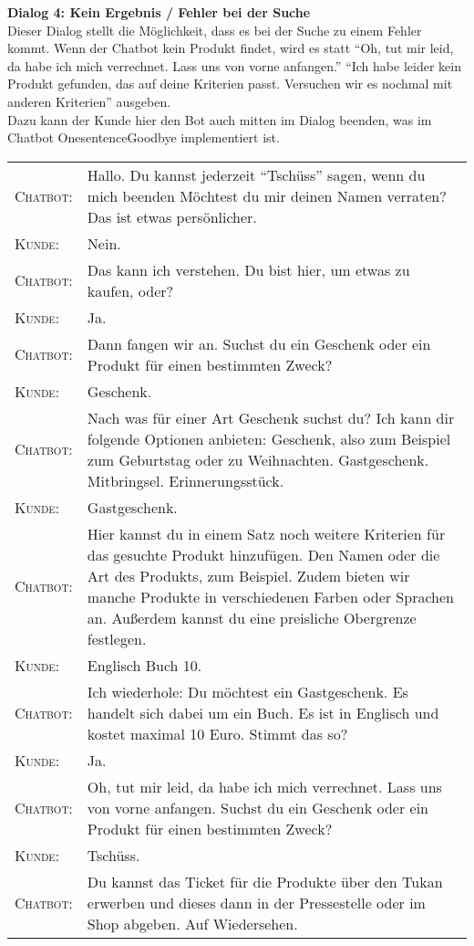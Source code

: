\Large\textbf{Dialog 4: Kein Ergebnis / Fehler bei der Suche}\\
\normalsize
Dieser Dialog stellt die Möglichkeit, dass es bei der Suche zu einem Fehler kommt. Wenn der Chatbot kein Produkt findet, wird es statt "`Oh, tut mir leid, da habe ich mich verrechnet. Lass uns von vorne anfangen."' "`Ich habe leider kein Produkt gefunden, das auf deine Kriterien passt. Versuchen wir es nochmal mit anderen Kriterien"' ausgeben.\\
Dazu kann der Kunde hier den Bot auch mitten im Dialog beenden, was im Chatbot OnesentenceGoodbye implementiert ist.
\vspace{8pt}
\begin{center}
\begin{tabular}{p{}p{}}
	\textsc{Chatbot:} & Hallo. Du kannst jederzeit "`Tschüss"' sagen, wenn du mich beenden  Möchtest du mir deinen Namen verraten? Das ist etwas persönlicher. \\
	\textsc{Kunde:} & Nein.\\
	\textsc{Chatbot:} & Das kann ich verstehen. Du bist hier, um etwas zu kaufen, oder? \\
	\textsc{Kunde:} & Ja. \\
	\textsc{Chatbot:} & Dann fangen wir an. Suchst du ein Geschenk oder ein Produkt für einen bestimmten Zweck? \\
	\textsc{Kunde:} & Geschenk.\\
	\textsc{Chatbot:} & Nach was für einer Art Geschenk suchst du? Ich kann dir folgende Optionen anbieten: Geschenk, also zum Beispiel zum Geburtstag oder zu Weihnachten. Gastgeschenk. Mitbringsel. Erinnerungsstück.\\
	\textsc{Kunde:} & Gastgeschenk. \\
	\textsc{Chatbot:} & Hier kannst du in einem Satz noch weitere Kriterien für das gesuchte Produkt hinzufügen. Den Namen oder die Art des Produkts, zum Beispiel. Zudem bieten wir manche Produkte in verschiedenen Farben oder Sprachen an. Außerdem kannst du eine preisliche Obergrenze festlegen.\\
	\textsc{Kunde:} & Englisch Buch 10.\\
	\textsc{Chatbot:} & Ich wiederhole: Du möchtest ein Gastgeschenk. Es handelt sich dabei um ein Buch. Es ist in Englisch und kostet maximal 10 Euro. Stimmt das so? \\
	\textsc{Kunde:} & Ja. \\
	\textsc{Chatbot:} & Oh, tut mir leid, da habe ich mich verrechnet. Lass uns von vorne anfangen. Suchst du ein Geschenk oder ein Produkt für einen bestimmten Zweck? \\
	\textsc{Kunde:} & Tschüss. \\
	\textsc{Chatbot:} & Du kannst das Ticket für die Produkte über den Tukan erwerben und dieses dann in der Pressestelle oder im Shop abgeben. Auf Wiedersehen.\\
	\end{tabular}
\end{center}


